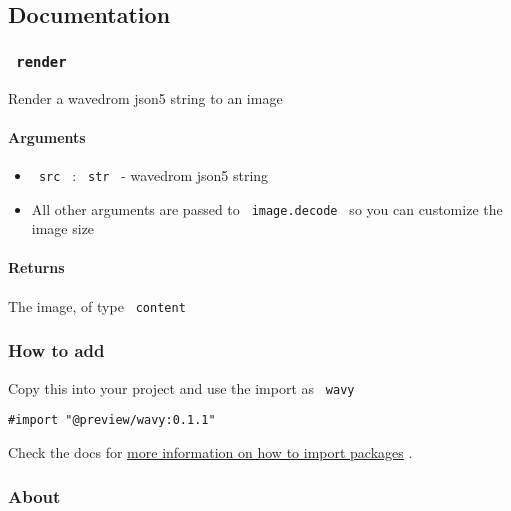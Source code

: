 \subsection{Documentation}\label{documentation}

\subsubsection{\texorpdfstring{\texttt{\ render\ }}{ render }}\label{render}

Render a wavedrom json5 string to an image

\paragraph{Arguments}\label{arguments}

\begin{itemize}
\tightlist
\item
  \texttt{\ src\ } : \texttt{\ str\ } - wavedrom json5 string
\item
  All other arguments are passed to \texttt{\ image.decode\ } so you can
  customize the image size
\end{itemize}

\paragraph{Returns}\label{returns}

The image, of type \texttt{\ content\ }

\subsubsection{How to add}\label{how-to-add}

Copy this into your project and use the import as \texttt{\ wavy\ }

\begin{verbatim}
#import "@preview/wavy:0.1.1"
\end{verbatim}



Check the docs for
\href{https://typst.app/docs/reference/scripting/\#packages}{more
information on how to import packages} .

\subsubsection{About}\label{about}

